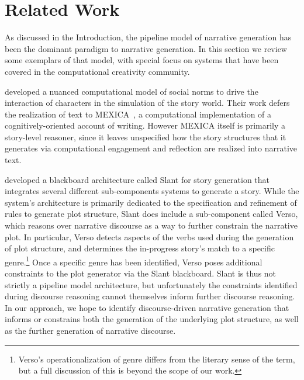 \section{Related Work}

As discussed in the Introduction, the pipeline model of narrative generation 
has been the dominant paradigm to narrative generation. In this section we
review some exemplars of that model, with special focus on systems that have
been covered in the computational creativity community.

 developed a nuanced computational model of social
norms to drive the interaction of characters in the simulation of the story
world. Their work defers the realization of text to
MEXICA~\cite{perez2001mexica}, a computational implementation of a
cognitively-oriented account of writing. However MEXICA itself is primarily a
story-level reasoner, since it leaves unspecified how the story structures that
it generates via computational engagement and reflection are realized into
narrative text.

 developed a blackboard architecture called Slant for
story generation that integrates several different sub-components systems to
generate a story. While the system's architecture is primarily dedicated to the
specification and refinement of rules to generate plot structure, Slant does
include a sub-component called Verso, which reasons over narrative discourse as
a way to further constrain the narrative plot. In particular, Verso detects
aspects of the verbs used during the generation of plot structure, and
determines the in-progress story's match to a specific genre.\footnote{Verso's
operationalization of genre differs from the literary sense of the term, but a
full discussion of this is beyond the scope of our work.} Once a specific genre
has been identified, Verso poses additional constraints to the plot generator
via the Slant blackboard. Slant is thus not strictly a pipeline model
architecture, but unfortunately the constraints identified during discourse
reasoning cannot themselves inform further discourse reasoning. In our approach,
we hope to identify discourse-driven narrative generation that informs or
constrains both the generation of the underlying plot structure, as well as the
further generation of narrative discourse.

